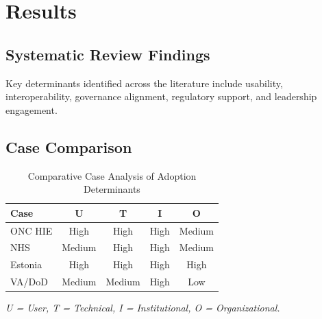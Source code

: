 \section{Results}

\subsection{Systematic Review Findings}
Key determinants identified across the literature include usability, interoperability, governance alignment, regulatory support, and leadership engagement.

\subsection{Case Comparison}
\begin{table}[H]
\caption{Comparative Case Analysis of Adoption Determinants}
\centering
\begin{tabular}{lcccc}
\toprule
Case & U & T & I & O \\
\midrule
ONC HIE & High & High & High & Medium \\
NHS & Medium & High & High & Medium \\
Estonia & High & High & High & High \\
VA/DoD & Medium & Medium & High & Low \\
\bottomrule
\end{tabular}
\end{table}
\vspace{0.5em}
\footnotesize
\textit{U = User, T = Technical, I = Institutional, O = Organizational.}
\normalsize